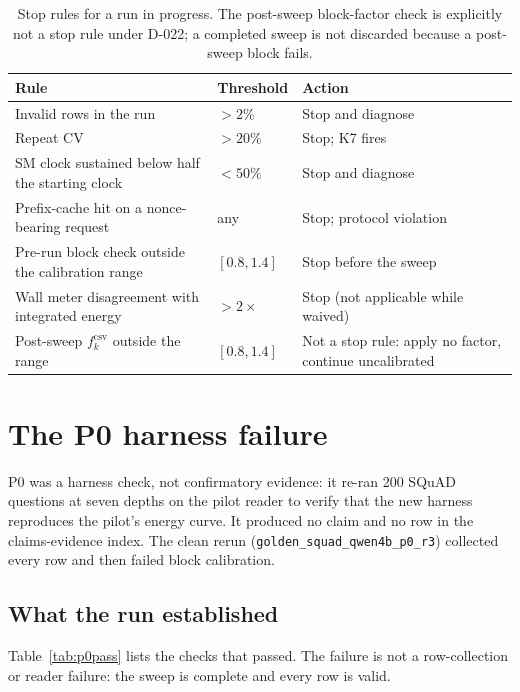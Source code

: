 \documentclass[a4paper,fleqn]{cas-sc}
\begin{document}
\begin{table}[pos=htbp]
  \centering
  \caption{Stop rules for a run in progress. The post-sweep block-factor check is explicitly not
  a stop rule under D-022; a completed sweep is not discarded because a post-sweep block fails.}
  \label{tab:stop}
  \small
  \begin{tabularx}{\textwidth}{>{\raggedright\arraybackslash}p{6.0cm}>{\raggedright\arraybackslash}p{3.0cm}>{\raggedright\arraybackslash}X}
    \toprule
    \textbf{Rule} & \textbf{Threshold} & \textbf{Action} \\
    \midrule
    Invalid rows in the run & $>2\%$ & Stop and diagnose \\
    Repeat CV & $>20\%$ & Stop; K7 fires \\
    SM clock sustained below half the starting clock & $<50\%$ & Stop and diagnose \\
    Prefix-cache hit on a nonce-bearing request & any & Stop; protocol violation \\
    Pre-run block check outside the calibration range & $[0.8,1.4]$ & Stop before the sweep \\
    Wall meter disagreement with integrated energy & $>2\times$ & Stop (not applicable while waived) \\
    Post-sweep $f^{\mathrm{csv}}_k$ outside the range & $[0.8,1.4]$ & Not a stop rule: apply no factor, continue uncalibrated \\
    \bottomrule
  \end{tabularx}
\end{table}

\section{The P0 harness failure}\label{sec:s5}

P0 was a harness check, not confirmatory evidence: it re-ran 200 SQuAD questions at seven depths
on the pilot reader to verify that the new harness reproduces the pilot's energy curve. It
produced no claim and no row in the claims-evidence index. The clean rerun
(\texttt{golden\_squad\_qwen4b\_p0\_r3}) collected every row and then failed block calibration.

\subsection{What the run established}

Table~\ref{tab:p0pass} lists the checks that passed. The failure is not a row-collection or
reader failure: the sweep is complete and every row is valid.
\end{document}
